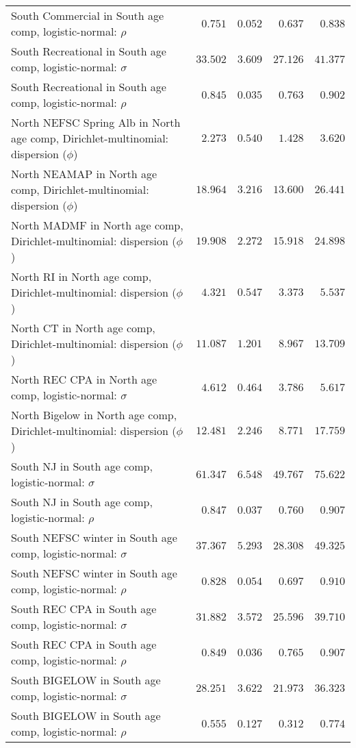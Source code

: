 \documentclass[
]{article}
\begin{document}
\begin{landscape}
\begin{longtable}[t]{lrrrr}
South Commercial in South age comp, logistic-normal: $\rho$ & $0.751$ & $0.052$ & $0.637$ & $0.838$\\
\addlinespace
South Recreational in South age comp, logistic-normal: $\sigma$ & $33.502$ & $3.609$ & $27.126$ & $41.377$\\
South Recreational in South age comp, logistic-normal: $\rho$ & $0.845$ & $0.035$ & $0.763$ & $0.902$\\
North NEFSC Spring Alb in North age comp, Dirichlet-multinomial: dispersion ($\phi$) & $2.273$ & $0.540$ & $1.428$ & $3.620$\\
North NEAMAP in North age comp, Dirichlet-multinomial: dispersion ($\phi$) & $18.964$ & $3.216$ & $13.600$ & $26.441$\\
North MADMF in North age comp, Dirichlet-multinomial: dispersion ($\phi$) & $19.908$ & $2.272$ & $15.918$ & $24.898$\\
\addlinespace
North RI in North age comp, Dirichlet-multinomial: dispersion ($\phi$) & $4.321$ & $0.547$ & $3.373$ & $5.537$\\
North CT in North age comp, Dirichlet-multinomial: dispersion ($\phi$) & $11.087$ & $1.201$ & $8.967$ & $13.709$\\
North REC CPA in North age comp, logistic-normal: $\sigma$ & $4.612$ & $0.464$ & $3.786$ & $5.617$\\
North Bigelow in North age comp, Dirichlet-multinomial: dispersion ($\phi$) & $12.481$ & $2.246$ & $8.771$ & $17.759$\\
South NJ in South age comp, logistic-normal: $\sigma$ & $61.347$ & $6.548$ & $49.767$ & $75.622$\\
\addlinespace
South NJ in South age comp, logistic-normal: $\rho$ & $0.847$ & $0.037$ & $0.760$ & $0.907$\\
South NEFSC winter in South age comp, logistic-normal: $\sigma$ & $37.367$ & $5.293$ & $28.308$ & $49.325$\\
South NEFSC winter in South age comp, logistic-normal: $\rho$ & $0.828$ & $0.054$ & $0.697$ & $0.910$\\
South REC CPA in South age comp, logistic-normal: $\sigma$ & $31.882$ & $3.572$ & $25.596$ & $39.710$\\
South REC CPA in South age comp, logistic-normal: $\rho$ & $0.849$ & $0.036$ & $0.765$ & $0.907$\\
\addlinespace
South BIGELOW in South age comp, logistic-normal: $\sigma$ & $28.251$ & $3.622$ & $21.973$ & $36.323$\\
South BIGELOW in South age comp, logistic-normal: $\rho$ & $0.555$ & $0.127$ & $0.312$ & $0.774$\\

\end{longtable}
\end{landscape}
\end{document}
